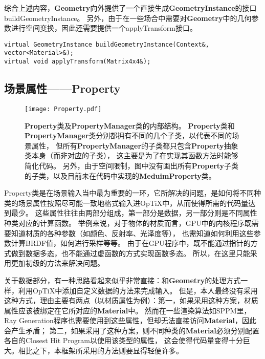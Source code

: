 综合上述内容，\textbf{Geometry}向外提供了一个直接生成\textbf{GeometryInstance}的接口buildGeometryInstance。
另外，由于在一些场合中需要对\textbf{Geometry}中的几何参数进行空间变换，因此还需要提供一个applyTransform接口。

\lstset{language=C++}
\begin{lstlisting}
virtual GeometryInstance buildGeometryInstance(Context&, vector<Material>&);
virtual void applyTransform(Matrix4x4&);
\end{lstlisting}

\subsection{场景属性——Property}

\begin{figure}[h]
    \centering
    \texttt{[image: Property.pdf]}
    \caption{\textbf{Property}类及\textbf{PropertyManager}类的内部结构。
    \textbf{Property}类和\textbf{PropertyManager}类分别都拥有不同的几个子类，以代表不同的场景属性，
    但所有\textbf{PropertyManager}的子类都只包含\textbf{Property}抽象类本身（而非对应的子类），
    这主要是为了在实现其函数方法时能够简化代码。
    另外，由于空间限制，图中没有画出所有\textbf{Property}子类的子类，以及目前未在代码中实现的\textbf{MeduimProperty}类。}
    \label{tab:property}
\end{figure}

Property类是在场景输入当中最为重要的一环，它所解决的问题，是如何将不同种类的场景属性按照尽可能一致地格式输入进OpTiX中，从而使得所需的代码量达到最少。
这些属性往往由两部分组成，第一部分是数据，另一部分则是不同属性种类对应的计算函数。
举例来说，对于物体的材质而言，GPU中的内核程序既需要知道材质的各种参数（如颜色、反射率、光泽度等），
也需知道如何利用这些参数计算BRDF值，如何进行采样等等。
由于在GPU程序中，既不能通过指针的方式做到数据多态，也不能通过虚函数的方式实现函数多态。
所以，在这里只能采用更加初级的方法来解决问题。

关于数据部分，有一种思路看起来似乎非常直接：和\textbf{Geometry}的处理方式一样，利用OpTiX中添加自定义数据的方法来完成输入。
但是，本人最终没有采用这种方式，理由主要有两点（以材质属性为例）：第一，如果采用这种方案，材质属性应该被绑定在它所对应的\textbf{Material}中。
然而在一些渲染算法如SPPM里，Ray Generation程序也需要使用到这些属性，但却无法直接访问\textbf{Material}，因此会产生矛盾；
第二，如果采用了这种方案，则不同种类的\textbf{Material}必须分别配置各自的Closest Hit Program以使用该类型的属性，
这会使得代码量变得十分巨大。相比之下，本框架所采用的方法则要显得轻便许多。

